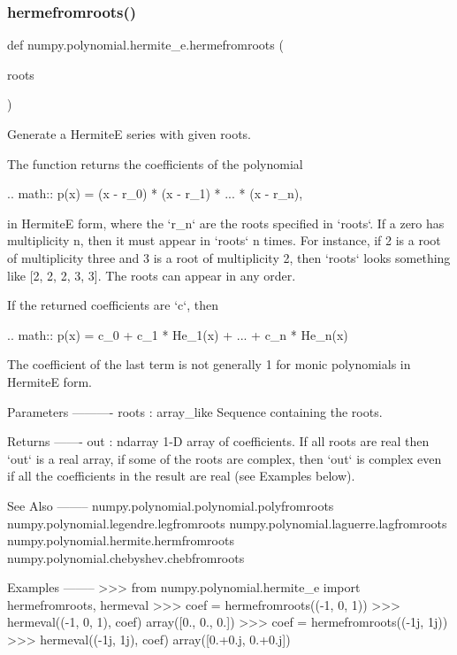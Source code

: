  \mbox{\label{namespacenumpy_1_1polynomial_1_1hermite__e_a04b538fffbe3c80080cbf3ee16304ad5}} 
\subsubsection{\texorpdfstring{hermefromroots()}{hermefromroots()}}
{\footnotesize\ttfamily def numpy.\+polynomial.\+hermite\+\_\+e.\+hermefromroots (\begin{DoxyParamCaption}\item[{}]{roots }\end{DoxyParamCaption})}

\begin{DoxyVerb}Generate a HermiteE series with given roots.

The function returns the coefficients of the polynomial

.. math:: p(x) = (x - r_0) * (x - r_1) * ... * (x - r_n),

in HermiteE form, where the `r_n` are the roots specified in `roots`.
If a zero has multiplicity n, then it must appear in `roots` n times.
For instance, if 2 is a root of multiplicity three and 3 is a root of
multiplicity 2, then `roots` looks something like [2, 2, 2, 3, 3]. The
roots can appear in any order.

If the returned coefficients are `c`, then

.. math:: p(x) = c_0 + c_1 * He_1(x) + ... +  c_n * He_n(x)

The coefficient of the last term is not generally 1 for monic
polynomials in HermiteE form.

Parameters
----------
roots : array_like
    Sequence containing the roots.

Returns
-------
out : ndarray
    1-D array of coefficients.  If all roots are real then `out` is a
    real array, if some of the roots are complex, then `out` is complex
    even if all the coefficients in the result are real (see Examples
    below).

See Also
--------
numpy.polynomial.polynomial.polyfromroots
numpy.polynomial.legendre.legfromroots
numpy.polynomial.laguerre.lagfromroots
numpy.polynomial.hermite.hermfromroots
numpy.polynomial.chebyshev.chebfromroots

Examples
--------
>>> from numpy.polynomial.hermite_e import hermefromroots, hermeval
>>> coef = hermefromroots((-1, 0, 1))
>>> hermeval((-1, 0, 1), coef)
array([0., 0., 0.])
>>> coef = hermefromroots((-1j, 1j))
>>> hermeval((-1j, 1j), coef)
array([0.+0.j, 0.+0.j])\end{DoxyVerb}
 \mbox{\label{namespacenumpy_1_1polynomial_1_1hermite__e_ad223b7669c06c32f7fce538a81f6301b}} 
